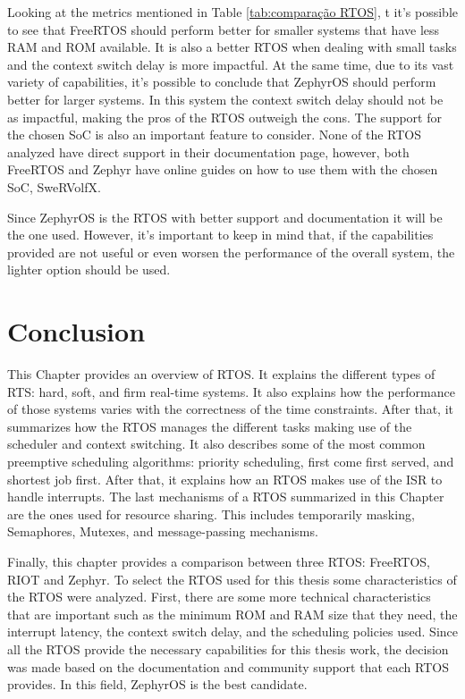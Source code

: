 Looking at the metrics mentioned in Table \ref{tab:comparação RTOS}, t it's possible to see that FreeRTOS should perform better for smaller systems that have less RAM and ROM available. It is also a better RTOS when dealing with small tasks and the context switch delay is more impactful. At the same time, due to its vast variety of capabilities, it's possible to conclude that ZephyrOS should perform better for larger systems. In this system the context switch delay should not be as impactful, making the pros of the RTOS outweigh the cons. The support for the chosen SoC is also an important feature to consider. None of the RTOS analyzed have direct support in their documentation page, however, both FreeRTOS and Zephyr have online guides on how to use them with the chosen SoC, SweRVolfX. 

Since ZephyrOS is the RTOS with better support and documentation it will be the one used. However, it's important to keep in mind that, if the capabilities provided are not useful or even worsen the performance of the overall system, the lighter option should be used.


\section{Conclusion}
This Chapter provides an overview of RTOS. It explains the different types of RTS: hard, soft, and firm real-time systems. It also explains how the performance of those systems varies with the correctness of the time constraints. After that, it summarizes how the RTOS manages the different tasks making use of the scheduler and context switching. It also describes some of the most common preemptive scheduling algorithms: priority scheduling, first come first served, and shortest job first. After that, it explains how an RTOS makes use of the ISR to handle interrupts. The last mechanisms of a RTOS summarized in this Chapter are the ones used for resource sharing. This includes temporarily masking, Semaphores, Mutexes, and message-passing mechanisms.

Finally, this chapter provides a comparison between three RTOS: FreeRTOS, RIOT and Zephyr. To select the RTOS used for this thesis some characteristics of the RTOS were analyzed. First, there are some more technical characteristics that are important such as the minimum ROM and RAM size that they need, the interrupt latency, the context switch delay, and the scheduling policies used. Since all the RTOS provide the necessary capabilities for this thesis work, the decision was made based on the documentation and community support that each RTOS provides. In this field, ZephyrOS is the best candidate.










